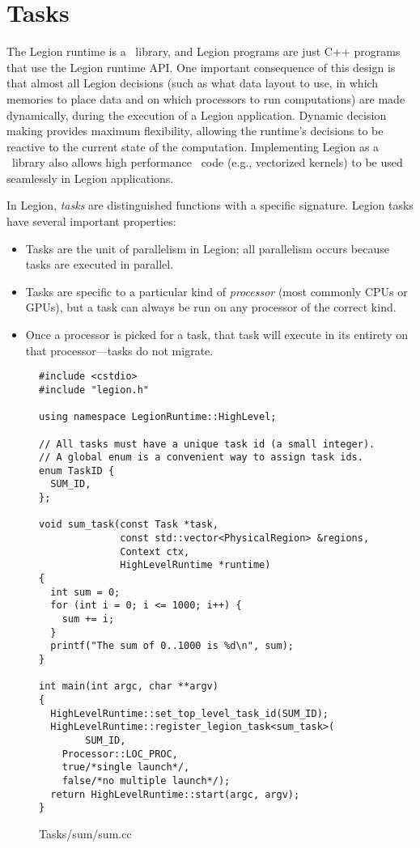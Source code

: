 \chapter{Tasks}
\label{chap:tasks}

The Legion runtime is a \Cpp\ library, and
Legion programs are just C++ programs that use the Legion runtime API.
One important consequence of this design is that almost all Legion decisions
(such as what data layout to use, in which memories to place data and on which
processors to run computations) are made dynamically,  during the execution of 
a Legion application.  Dynamic decision making provides maximum flexibility, 
allowing the runtime's decisions to be reactive to the current state of the computation.
Implementing Legion as a \Cpp\ library also allows high performance \Cpp\ code
(e.g., vectorized kernels) to be used seamlessly in Legion applications.

In Legion, {\em tasks} are distinguished functions with a specific signature.
Legion tasks have several important properties:
\begin{itemize}
\item Tasks are the unit of parallelism in Legion; all parallelism occurs because tasks are executed in parallel.

\item Tasks are specific to a particular kind of {\em processor} (most commonly CPUs or GPUs), but a task can always be run on any processor
of the correct kind.

\item Once a processor is picked for a task, that task will execute in its entirety on that processor---tasks do
not migrate.  

\end{itemize}


\begin{figure}
\begin{lstlisting}
#include <cstdio>
#include "legion.h"

using namespace LegionRuntime::HighLevel;

// All tasks must have a unique task id (a small integer).
// A global enum is a convenient way to assign task ids.
enum TaskID {
  SUM_ID,
};

void sum_task(const Task *task,
              const std::vector<PhysicalRegion> &regions,
              Context ctx, 
              HighLevelRuntime *runtime)
{
  int sum = 0;
  for (int i = 0; i <= 1000; i++) {
    sum += i;
  }
  printf("The sum of 0..1000 is %d\n", sum);
}

int main(int argc, char **argv)
{
  HighLevelRuntime::set_top_level_task_id(SUM_ID);
  HighLevelRuntime::register_legion_task<sum_task>(
        SUM_ID,
	Processor::LOC_PROC, 
	true/*single launch*/, 
	false/*no multiple launch*/);
  return HighLevelRuntime::start(argc, argv);
}
\end{lstlisting}
\caption{Tasks/sum/sum.cc}
\label{fig:simple}
\end{figure}

